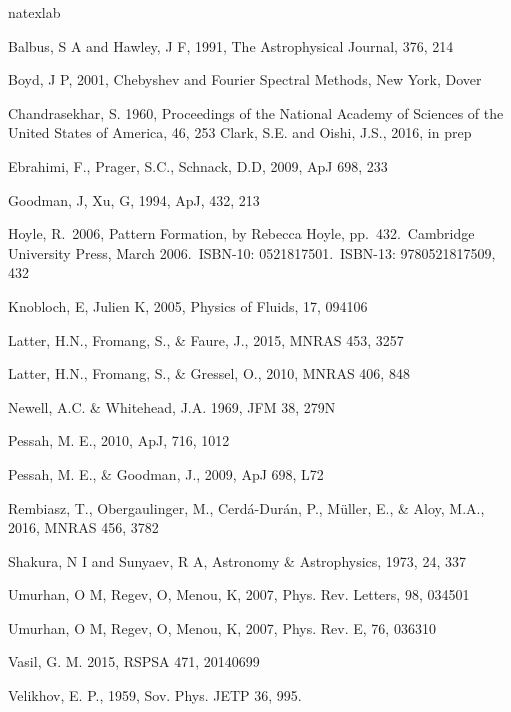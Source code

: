 \documentclass{emulateapj}
\begin{document}


\begin{thebibliography}{53}
\expandafter\ifx\csname natexlab\endcsname\relax\def\natexlab#1{#1}\fi

Balbus, S A and Hawley, J F, 1991, The Astrophysical Journal, 376, 214

Boyd, J P, 2001, Chebyshev and Fourier Spectral Methods, New York, Dover

Chandrasekhar, S. 1960, Proceedings of the National Academy of Sciences of the United States of America, 46, 253
Clark, S.E. and Oishi, J.S., 2016, in prep

Ebrahimi, F., Prager, S.C., Schnack, D.D, 2009, ApJ 698, 233

Goodman, J, Xu, G, 1994, ApJ, 432, 213

 Hoyle, R.\ 2006, Pattern
  Formation, by Rebecca Hoyle, pp.~432.~Cambridge University Press,
  March 2006.~ISBN-10: 0521817501.~ISBN-13: 9780521817509, 432

Knobloch, E, Julien K, 2005, Physics of Fluids, 17, 094106

Latter, H.N., Fromang, S., \& Faure, J., 2015, MNRAS 453, 3257

Latter, H.N., Fromang, S., \& Gressel, O., 2010, MNRAS 406, 848

Newell, A.C. \& Whitehead, J.A. 1969, JFM 38, 279N

Pessah, M. E., 2010, ApJ, 716, 1012

Pessah, M. E., \& Goodman, J., 2009, ApJ 698, L72 

Rembiasz, T., Obergaulinger, M., Cerd\'a-Dur\'an, P., M\"uller, E., \& Aloy, M.A., 2016, MNRAS 456, 3782

Shakura, N I and Sunyaev, R A, Astronomy \& Astrophysics, 1973, 24, 337

Umurhan, O M, Regev, O, Menou, K, 2007, Phys. Rev. Letters, 98, 034501

Umurhan, O M, Regev, O, Menou, K, 2007, Phys. Rev. E, 76, 036310

Vasil, G. M. 2015, RSPSA 471, 20140699

Velikhov, E. P., 1959, Sov. Phys. JETP 36, 995.

\end{thebibliography}
\end{document}
